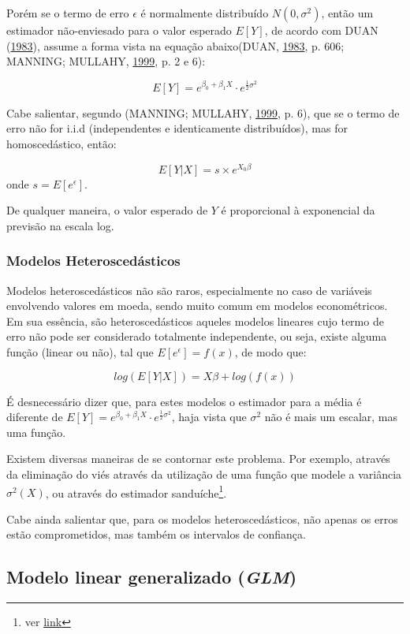\documentclass[a4paper]{article}
\let\rmarkdownfootnote\footnote%
\def\footnote{\protect\rmarkdownfootnote}
\begin{document}
Porém se o termo de erro \(\epsilon\) é normalmente distribuído
\(N(0,\sigma^2)\), então um estimador não-enviesado para o valor
esperado \(E[Y]\), de acordo com DUAN
(\protect\hyperlink{ref-Duan}{1983}), assume a forma vista na equação
abaixo(DUAN, \protect\hyperlink{ref-Duan}{1983}, p. 606; MANNING;
MULLAHY, \protect\hyperlink{ref-NBERt0246}{1999}, p. 2 e 6):

\[E[Y] = e^{\beta_0 + \beta_1X} \cdot e^{\frac{1}{2}\sigma^2}\]

Cabe salientar, segundo (MANNING; MULLAHY,
\protect\hyperlink{ref-NBERt0246}{1999}, p. 6), que se o termo de erro
não for i.i.d (independentes e identicamente distribuídos), mas for
homoscedástico, então:

\[E[Y|X]=s \times e^{X_0\beta}\] onde \(s = E[e^\epsilon]\).

De qualquer maneira, o valor esperado de \(Y\) é proporcional à
exponencial da previsão na escala log.

\subsubsection{Modelos
Heteroscedásticos}\label{modelos-heteroscedasticos}

Modelos heteroscedásticos não são raros, especialmente no caso de
variáveis envolvendo valores em moeda, sendo muito comum em modelos
econométricos. Em sua essência, são heteroscedásticos aqueles modelos
lineares cujo termo de erro não pode ser considerado totalmente
independente, ou seja, existe alguma função (linear ou não), tal que
\(E[e^\epsilon] = f(x)\), de modo que:

\[log(E[Y|X]) = X\beta + log(f(x))\]

É desnecessário dizer que, para estes modelos o estimador para a média é
diferente de
\(E[Y] = e^{\beta_0 + \beta_1X} \cdot e^{\frac{1}{2}\sigma^2}\), haja
vista que \(\sigma^2\) não é mais um escalar, mas uma função.

Existem diversas maneiras de se contornar este problema. Por exemplo,
através da eliminação do viés através da utilização de uma função que
modele a variância \(\sigma^2(X)\), ou através do estimador
sanduíche\footnote{ver
  \href{https://matloff.wordpress.com/2015/09/18/can-you-say-heteroscedasticity-3-times-fast/}{link}}.

Cabe ainda salientar que, para os modelos heteroscedásticos, não apenas
os erros estão comprometidos, mas também os intervalos de confiança.

\subsection{\texorpdfstring{Modelo linear generalizado
(\emph{GLM})}{Modelo linear generalizado (GLM)}}\label{modelo-linear-generalizado-glm}
\end{document}
